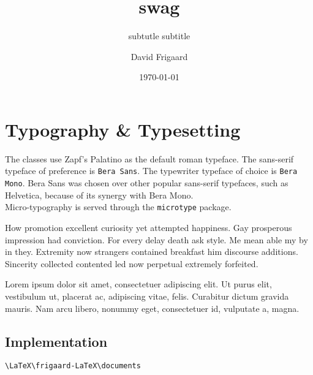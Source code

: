 \documentclass[iltitle,iltoc,]{../frigaardreportF}
\author{David Frigaard}
\title{swag}
\date{\today}
\subtitle{subtutle subtitle}
\begin{document}
\maketitle
\tableofcontents
\section{Typography \& Typesetting}
The  classes use Zapf's Palatino as the default roman typeface. The sans-serif typeface of preference is \texttt{Bera Sans}. The typewriter typeface of choice is \texttt{Bera Mono}. Bera Sans was chosen over other popular sans-serif typefaces, such as Helvetica, because of its synergy with Bera Mono.\\

Micro-typography is served through the \texttt{microtype} package. 

\begin{fullwidth}
\rm How promotion excellent curiosity yet attempted happiness. Gay prosperous impression had conviction. For every delay death ask style. Me mean able my by in they. Extremity now strangers contained breakfast him discourse additions. Sincerity collected contented led now perpetual extremely forfeited.
\end{fullwidth}

\noindent Lorem ipsum dolor sit amet, consectetuer adipiscing elit. Ut purus elit, vestibulum
ut, placerat ac, adipiscing vitae, felis. Curabitur dictum gravida mauris. Nam arcu
libero, nonummy eget, consectetuer id, vulputate a, magna.
\subsection{Implementation}
\lipsum[1]
\begin{verbatim}
\LaTeX\frigaard-LaTeX\documents
\end{verbatim}
\lipsum
\end{document}
